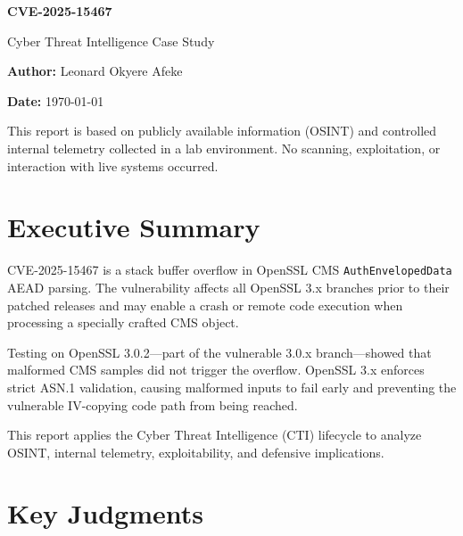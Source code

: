 \documentclass[12pt]{article}
\begin{document}
\begin{titlepage}
    \centering
    \vspace*{3cm}
    {\Huge \textbf{CVE-2025-15467}}\par
    \vspace{0.5cm}
    {\Large Cyber Threat Intelligence Case Study}\par
    \vspace{1.5cm}

    {\large \textbf{Author:} Leonard Okyere Afeke}\par
    \vspace{0.3cm}
    {\large \textbf{Date:} \today}\par
    \vspace{2cm}

    \vfill
    {\small This report is based on publicly available information (OSINT) 
    and controlled internal telemetry collected in a lab environment. 
    No scanning, exploitation, or interaction with live systems occurred.}
\end{titlepage}

\section*{Executive Summary}

CVE-2025-15467 is a stack buffer overflow in OpenSSL CMS 
\texttt{AuthEnvelopedData} AEAD parsing. The vulnerability affects all 
OpenSSL 3.x branches prior to their patched releases and may enable a 
crash or remote code execution when processing a specially crafted CMS 
object.

Testing on OpenSSL 3.0.2—part of the vulnerable 3.0.x branch—showed that 
malformed CMS samples did not trigger the overflow. OpenSSL 3.x enforces 
strict ASN.1 validation, causing malformed inputs to fail early and 
preventing the vulnerable IV-copying code path from being reached.

This report applies the Cyber Threat Intelligence (CTI) lifecycle to 
analyze OSINT, internal telemetry, exploitability, and defensive 
implications.

\section{Key Judgments}
\end{document}
